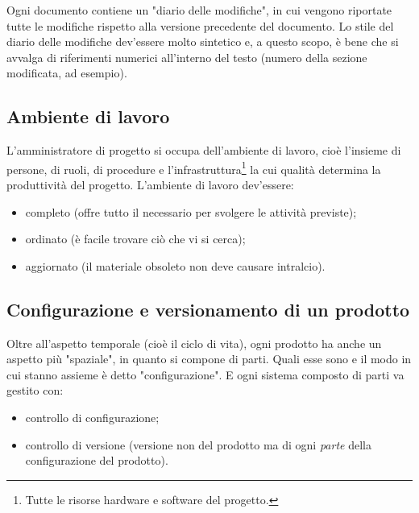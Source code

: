 \documentclass[a4paper]{article}
\begin{document}
		
Ogni documento contiene un "diario delle modifiche", in cui vengono riportate tutte le modifiche rispetto alla versione precedente del documento. Lo stile del diario delle modifiche dev'essere molto sintetico e, a questo scopo, è bene che si avvalga di riferimenti numerici all'interno del testo (numero della sezione modificata, ad esempio).

		
	\subsection{Ambiente di lavoro}

		
L'amministratore di progetto si occupa dell'ambiente di lavoro, cioè l'insieme di persone, di ruoli, di procedure e l'infrastruttura\footnote{Tutte le risorse hardware e software del progetto.} la cui qualità determina la produttività del progetto. L'ambiente di lavoro dev'essere:
		
	\begin{itemize}
		
			
	\item completo (offre tutto il necessario per svolgere le attività previste);
			
	\item ordinato (è facile trovare ciò che vi si cerca);
			
	\item aggiornato (il materiale obsoleto non deve causare intralcio).
		
	\end{itemize}


		
	\subsection{Configurazione e versionamento di un prodotto}

		
Oltre all'aspetto temporale (cioè il ciclo di vita), ogni prodotto ha anche un aspetto più "spaziale", in quanto si compone di parti. Quali esse sono e il modo in cui stanno assieme è detto "configurazione". E ogni sistema composto di parti va gestito con:
		
	\begin{itemize}
		
			
	\item controllo di configurazione;
			
	\item controllo di versione (versione non del prodotto ma di ogni \emph{parte} della configurazione del prodotto).
		
	\end{itemize}
\end{document}
